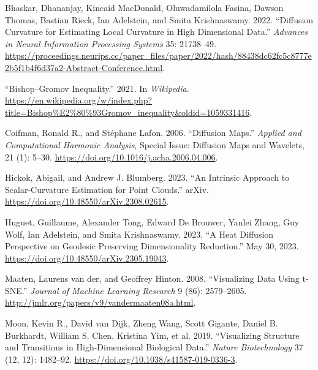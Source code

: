\documentclass[
  letterpaper,
  DIV=11,
  numbers=noendperiod]{scrartcl}
\newlength{\cslhangindent}
\newenvironment{CSLReferences}[2] %
 {\begin{list}{}{%
  \setlength{\itemindent}{0pt}
  \setlength{\leftmargin}{0pt}
  \setlength{\parsep}{0pt}
  \ifodd #1
   \setlength{\leftmargin}{\cslhangindent}
   \setlength{\itemindent}{-1\cslhangindent}
  \fi
  \setlength{\itemsep}{#2\baselineskip}}}
 {\end{list}}
\theoremstyle{plain}
\theoremstyle{plain}
\theoremstyle{definition}
\theoremstyle{plain}
\theoremstyle{definition}
\theoremstyle{plain}
\theoremstyle{remark}
\begin{document}
\label{refs}
\begin{CSLReferences}{1}{0}
Bhaskar, Dhananjay, Kincaid MacDonald, Oluwadamilola Fasina, Dawson
Thomas, Bastian Rieck, Ian Adelstein, and Smita Krishnaswamy. 2022.
{``Diffusion Curvature for Estimating Local Curvature in High
Dimensional Data.''} \emph{Advances in Neural Information Processing
Systems} 35: 21738--49.
\url{https://proceedings.neurips.cc/paper_files/paper/2022/hash/88438dc62fc5c8777e2b5f1b4f6d37a2-Abstract-Conference.html}.

{``Bishop--{Gromov} Inequality.''} 2021. In \emph{Wikipedia}.
\url{https://en.wikipedia.org/w/index.php?title=Bishop\%E2\%80\%93Gromov_inequality&oldid=1059331416}.

Coifman, Ronald R., and Stéphane Lafon. 2006. {``Diffusion Maps.''}
\emph{Applied and Computational Harmonic Analysis}, Special {Issue}:
{Diffusion Maps} and {Wavelets}, 21 (1): 5--30.
\url{https://doi.org/10.1016/j.acha.2006.04.006}.

Hickok, Abigail, and Andrew J. Blumberg. 2023. {``An {Intrinsic
Approach} to {Scalar-Curvature Estimation} for {Point Clouds}.''} arXiv.
\url{https://doi.org/10.48550/arXiv.2308.02615}.

Huguet, Guillaume, Alexander Tong, Edward De Brouwer, Yanlei Zhang, Guy
Wolf, Ian Adelstein, and Smita Krishnaswamy. 2023. {``A {Heat Diffusion
Perspective} on {Geodesic Preserving Dimensionality Reduction}.''} May
30, 2023. \url{https://doi.org/10.48550/arXiv.2305.19043}.

Maaten, Laurens van der, and Geoffrey Hinton. 2008. {``Visualizing
{Data} Using t-{SNE}.''} \emph{Journal of Machine Learning Research} 9
(86): 2579--2605. \url{http://jmlr.org/papers/v9/vandermaaten08a.html}.

Moon, Kevin R., David van Dijk, Zheng Wang, Scott Gigante, Daniel B.
Burkhardt, William S. Chen, Kristina Yim, et al. 2019. {``Visualizing
Structure and Transitions in High-Dimensional Biological Data.''}
\emph{Nature Biotechnology} 37 (12, 12): 1482--92.
\url{https://doi.org/10.1038/s41587-019-0336-3}.


\end{CSLReferences}
\end{document}
